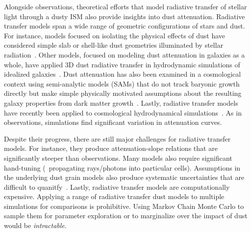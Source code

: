 Alongside observations, theoretical efforts that model radiative transfer of
stellar light through a dusty ISM also provide insights into dust attenuation.
Radiative transfer models span a wide range of geometric configurations of
stars and dust. For instance, models focused on isolating the physical effects
of dust have considered simple slab or shell-like dust geometries illuminated
by stellar radiation~\citep[\eg][]{witt1996, witt2000, seon2016}. Other models,
focused on modeling dust attenuation in galaxies as a whole, have applied 3D
dust radiative transfer in hydrodynamic simulations of idealized
galaxies~\citep[\eg][]{jonsson2006, rocha2008, hayward2015, natale2015,
hou2017}. Dust attenuation has also been examined in a cosmological context
using semi-analytic models (SAMs) that do not track baryonic growth directly 
but make simple physically motivated assumptions about the resulting galaxy
properties from dark matter growth~\citep[\eg][]{granato2000,
fontanot2009, wilkins2012, gonzalez-perez2013, popping2017}. Lastly, radiative transfer
models have recently been applied to cosmological hydrodynamical
simulations~\cite[\eg][]{camps2015, narayanan2018, trayford2020}. As in
observations, simulations find significant variation in attenuation
curves. %

Despite their progress, there are still major challenges for radiative
transfer models. For instance, they produce attenuation-slope relations that
are significantly steeper than observations. Many models also require
significant hand-tuning (\eg~propagating rays/photons into
particular cells). Assumptions in the underlying dust grain models also produce
systematic uncertainties that are difficult to quanitfy~\citep[see][for a
review]{steinacker2013}. Lastly, radiative transfer models 
are computationally expensive. Applying a range of radiative transfer dust
models to multiple simulations for comparisons is prohibitive. Using Markov
Chain Monte Carlo to sample them for parameter exploration or to marginalize
over the impact of dust would be {\em intractable}. 

